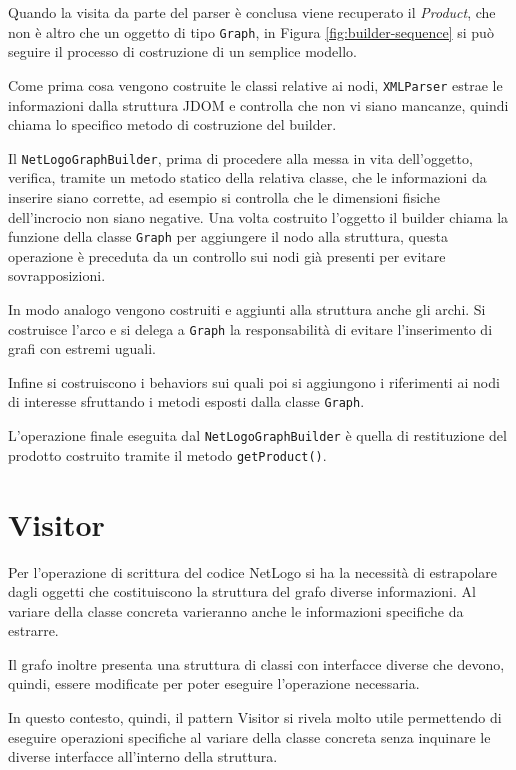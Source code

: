 Quando la visita da parte del parser è conclusa viene recuperato il \textit{Product}, che non è altro che un oggetto di tipo \texttt{Graph}, in Figura \ref{fig:builder-sequence} si può seguire il processo di costruzione di un semplice modello.

Come prima cosa vengono costruite le classi relative ai nodi, \texttt{XMLParser} estrae le informazioni dalla struttura JDOM e controlla che non vi siano mancanze, quindi chiama lo specifico metodo di costruzione del builder.

Il \texttt{NetLogoGraphBuilder}, prima di procedere alla messa in vita dell'oggetto, verifica, tramite un metodo statico della relativa classe, che le informazioni da inserire siano corrette, ad esempio si controlla che le dimensioni fisiche dell'incrocio non siano negative. Una volta costruito l'oggetto il builder chiama la funzione della classe \texttt{Graph} per aggiungere il nodo alla struttura, questa operazione è preceduta da un controllo sui nodi già presenti per evitare sovrapposizioni.

In modo analogo vengono costruiti e aggiunti alla struttura anche gli archi. Si costruisce l'arco e si delega a \texttt{Graph} la responsabilità di evitare l'inserimento di grafi con estremi uguali.

Infine si costruiscono i behaviors sui quali poi si aggiungono i riferimenti ai nodi di interesse sfruttando i metodi esposti dalla classe \texttt{Graph}.

L'operazione finale eseguita dal \texttt{NetLogoGraphBuilder} è quella di restituzione del prodotto costruito tramite il metodo \texttt{getProduct()}.

\section{Visitor}
\label{subsec:visitor}
Per l'operazione di scrittura del codice NetLogo si ha la necessità di estrapolare dagli oggetti che costituiscono la struttura del grafo diverse informazioni. Al variare della classe concreta varieranno anche le informazioni specifiche da estrarre.

Il grafo inoltre presenta una struttura di classi con interfacce diverse che devono, quindi, essere modificate per poter eseguire l'operazione necessaria.

In questo contesto, quindi, il pattern Visitor si rivela molto utile permettendo di eseguire operazioni specifiche al variare della classe concreta senza inquinare le diverse interfacce all'interno della struttura.

